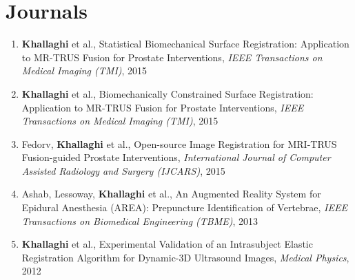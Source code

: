 \documentclass[letterpaper,11pt]{article}
\newcommand{\publicationItem}[4]{
  \item\small{
    {#1}{ et al., #2\vspace{-2pt}}{, \textit{#3}\vspace{-2pt}}{, #4\vspace{-2pt}}
  }
}
\newcommand{\publicationSubheadingListStart}{\begin{enumerate}[leftmargin=*]}
\newcommand{\publicationSubheadingListEnd}{\end{enumerate}}
\newcommand{\publicationSubItem}[4]{\publicationItem{#1}{#2}{#3}{#4}\vspace{-4pt}}
\begin{document}
\section{Journals}
  \publicationSubheadingListStart
    \publicationSubItem{\textbf{Khallaghi}}
      {Statistical Biomechanical Surface Registration: Application to MR-TRUS Fusion for Prostate Interventions}
      {IEEE Transactions on Medical Imaging (TMI)}{2015}
    \publicationSubItem{\textbf{Khallaghi}}
      {Biomechanically Constrained Surface Registration: Application to MR-TRUS Fusion for Prostate Interventions}
      {IEEE Transactions on Medical Imaging (TMI)}{2015}
    \publicationSubItem {Fedorv, \textbf{Khallaghi}}
      {Open-source Image Registration for MRI-TRUS Fusion-guided Prostate Interventions}
      {International Journal of Computer Assisted Radiology and Surgery (IJCARS)}{2015}
    \publicationSubItem{Ashab, Lessoway, \textbf{Khallaghi}}
      {An Augmented Reality System for Epidural Anesthesia (AREA): Prepuncture Identification of Vertebrae}
      {IEEE Transactions on Biomedical Engineering (TBME)}{2013}
    \publicationSubItem{\textbf{Khallaghi}}
      {Experimental Validation of an Intrasubject Elastic Registration Algorithm for Dynamic-3D Ultrasound Images}
      {Medical Physics}{2012}
  \publicationSubheadingListEnd
\end{document}
